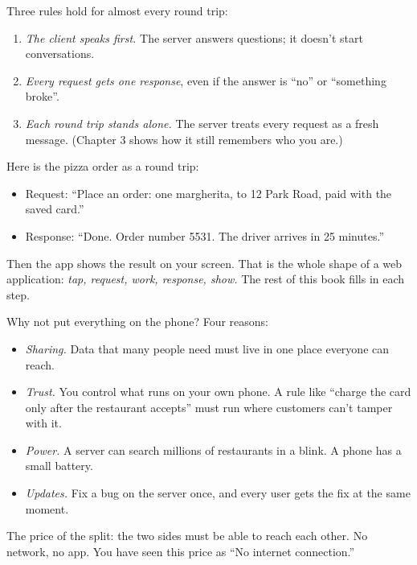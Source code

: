 \noindent{}Three rules hold for almost every round trip:

\begin{enumerate}
\def\labelenumi{\arabic{enumi}.}
\tightlist
\item
  \emph{The client speaks first.} The server answers questions; it doesn't start conversations.
\item
  \emph{Every request gets one response}, even if the answer is ``no'' or ``something broke''.
\item
  \emph{Each round trip stands alone.} The server treats every request as a fresh message. (Chapter 3 shows how it still remembers who you are.)
\end{enumerate}

\noindent{}Here is the pizza order as a round trip:

\begin{itemize}
\tightlist
\item
  Request: ``Place an order: one margherita, to 12 Park Road, paid with the saved card.''
\item
  Response: ``Done. Order number 5531. The driver arrives in 25 minutes.''
\end{itemize}

\noindent{}Then the app shows the result on your screen. That is the whole shape of a web application: \emph{tap, request, work, response, show.} The rest of this book fills in each step.

\label{webapp-01:why-split-an-app-at-all}

Why not put everything on the phone? Four reasons:

\begin{itemize}
\tightlist
\item
  \emph{Sharing.} Data that many people need must live in one place everyone can reach.
\item
  \emph{Trust.} You control what runs on your own phone. A rule like ``charge the card only after the restaurant accepts'' must run where customers can't tamper with it.
\item
  \emph{Power.} A server can search millions of restaurants in a blink. A phone has a small battery.
\item
  \emph{Updates.} Fix a bug on the server once, and every user gets the fix at the same moment.
\end{itemize}

\noindent{}The price of the split: the two sides must be able to reach each other. No network, no app. You have seen this price as ``No internet connection.''

